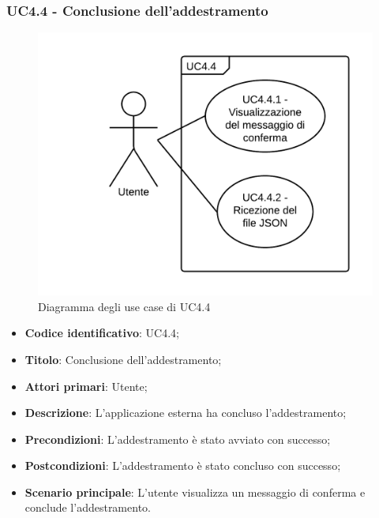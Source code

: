 \subsubsection{UC4.4 - Conclusione dell'addestramento}
\begin{figure}[H]
\includegraphics{img/UC4.4_-_Conclusione_dell_addestramento.png}
\caption{Diagramma degli use case di UC4.4}
\end{figure}
\begin{itemize}
    \item \textbf{Codice identificativo}: UC4.4;
    \item \textbf{Titolo}: Conclusione dell'addestramento;
    \item \textbf{Attori primari}: Utente;
    \item \textbf{Descrizione}: L'applicazione esterna ha concluso l'addestramento;
    \item \textbf{Precondizioni}: L'addestramento è stato avviato con successo;
    \item \textbf{Postcondizioni}: L'addestramento è stato concluso con successo;
    \item \textbf{Scenario principale}: L'utente visualizza un messaggio di conferma e conclude l'addestramento.
\end{itemize}

